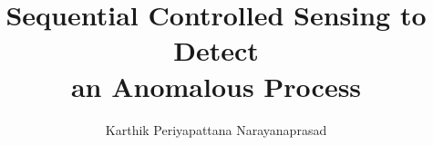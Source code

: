 \documentclass[oneside,12pt]{IIScthesisPSnPDF}
\newcommand{\blankpage}{
\newpage
\thispagestyle{empty}
\mbox{}
\newpage
}
\begin{document}
\title{Sequential Controlled Sensing to Detect \\ an Anomalous Process
} 

\submitdate{\monthyeardate\today} 
\phd
\author{Karthik Periyapattana Narayanaprasad}



\maketitle


%
%
%
%
%
%
%
%
%
%
%
\blankpage
\end{document}
